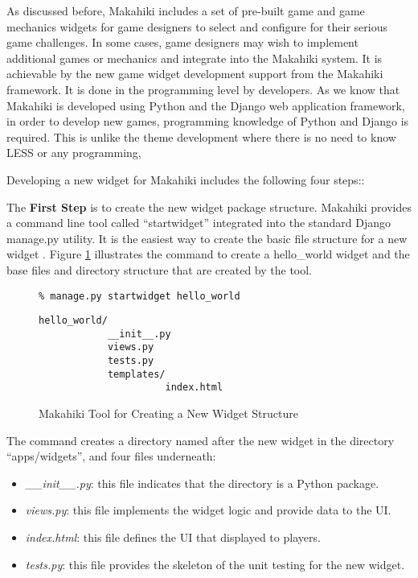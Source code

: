 As discussed before, Makahiki includes a set of pre-built game and game mechanics widgets for game designers to select and configure for their serious game challenges. In some cases, game designers may wish to implement additional games or mechanics and integrate into the Makahiki system. It is achievable by the new game widget development support from the Makahiki framework. It is done in the programming level by developers. As we know that Makahiki is developed using Python and the Django web application framework, in order to develop new games, programming knowledge of Python and Django is required. This is unlike the theme development where there is no need to know LESS or any programming, 

Developing a new widget for Makahiki includes the following four steps::

The {\bf First Step} is to create the new widget package structure. Makahiki provides a command line tool called ``startwidget'' integrated into the standard Django manage.py utility. It is the easiest way to create the basic file structure for a new widget . Figure \ref{fig:startwidget} illustrates the command to create a hello\_world widget and the base files and directory structure that are created by the tool. 

\begin{figure}[!ht]
\begin{lstlisting}
% manage.py startwidget hello_world
\end{lstlisting}
\begin{lstlisting}
hello_world/
            __init__.py
            views.py
            tests.py
            templates/
                      index.html
\end{lstlisting}
\caption{Makahiki Tool for Creating a New Widget Structure}
\label{fig:startwidget}
\end{figure}

The command creates a directory named after the new widget in the directory ``apps/widgets'', and four files underneath:
\begin{itemize}
\item {\em \_\_init\_\_.py}: this file indicates that the directory is a Python package.
\item {\em views.py}: this file implements the widget logic and provide data to the UI.
\item {\em index.html}: this file defines the UI that displayed to players.
\item {\em tests.py}: this file provides the skeleton of the unit testing for the new widget.
\end{itemize}

